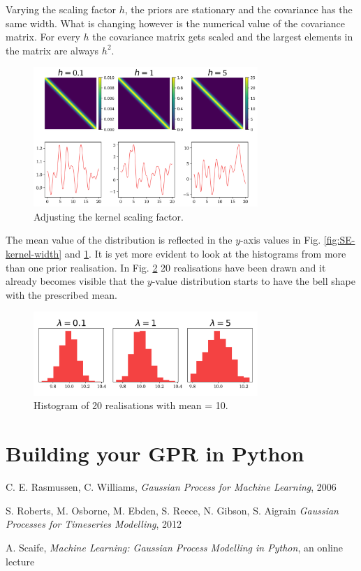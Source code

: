 \documentclass[10pt,twocolumn]{article}
\begin{document}
Varying the scaling factor $h$, the priors are stationary and the covariance has the same width. What is changing however is the numerical value of the covariance matrix. For every $h$ the covariance matrix gets scaled and the largest elements in the matrix are always $h^2$.

\begin{figure}[H]
\centering\includegraphics[width=8.5cm]{cov-Kernel-SE-changing-h-tex.png}
\caption{Adjusting the kernel scaling factor.}
\label{fig:SE-kernel-scaling-factor}
\end{figure}

The mean value of the distribution is reflected in the $y$-axis values in Fig. \ref{fig:SE-kernel-width} and \ref{fig:SE-kernel-scaling-factor}. It is yet more evident to look at the histograms from more than one prior realisation. In Fig. \ref{fig:realisation-histogram} 20 realisations have been drawn and it already becomes visible that the $y$-value distribution starts to have the bell shape with the prescribed mean.


\begin{figure}[H]
\centering\includegraphics[width=8.5cm]{realisation-Histogram-tex.png}
\caption{Histogram of 20 realisations with mean = 10.}
\label{fig:realisation-histogram}
\end{figure}


\section{Building your GPR in Python}











\thebibliography{}

 C. E. Rasmussen, C. Williams, \textit{Gaussian Process for Machine Learning}, 2006

 S. Roberts, M. Osborne, M. Ebden, S. Reece, N. Gibson, S. Aigrain \textit{Gaussian Processes for Timeseries Modelling}, 2012

 A. Scaife, \textit{Machine Learning: Gaussian Process Modelling in Python}, an online lecture



 \label{bib:pope}
\end{document}
